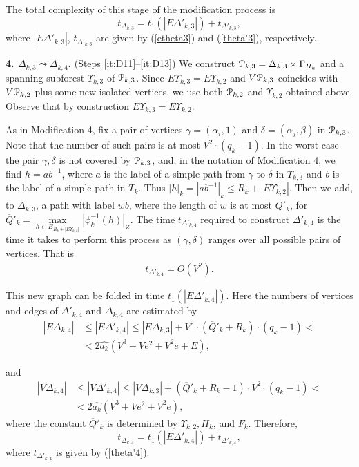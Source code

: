 \documentclass[a4paper,12pt]{article}
\renewcommand{\a}{\alpha }
\renewcommand{\b}{\beta }
\newcommand{\G}{\Gamma }
\newcommand{\g}{\gamma }
\newcommand{\D}{\Delta }
\renewcommand{\d}{\delta }
\newcommand{\U}{\Upsilon }
\newcommand{\cP}{{\cal{P}}}
\numberwithin{equation}{section}
\numberwithin{figure}{section}
\begin{document}
The total complexity of this stage of the modification process is
\begin{equation}\label{theta3}
t_{\D_{k,3}} = t_1(|E\D'_{k,3}|)
+ t_{\D'_{k,3}},
\end{equation}
where $|E\D'_{k,3}|$, $t_{\D'_{k,3}}$ are given by (\ref{etheta3}) and
(\ref{theta'3}), respectively.


{\bf 4. $\D_{k,3} \leadsto \D_{k,4}$.} (Steps \ref{it:D11}--\ref{it:D13})
We construct $\cP_{k,3}=\D_{k,3}\times
\G_{H_k}$ and a
spanning subforest $\U_{k,3}$ of $\cP_{k,3}$. Since $E\U_{k,3} =
E\U_{k,2}$ and $V\cP_{k,3}$ coincides with $V\cP_{k,2}$ plus some new isolated
vertices, we use both $\cP_{k,2}$ and $\U_{k,2}$ obtained above. Observe that by construction $E\U_{k,3} =
E\U_{k,2}$.


As in Modification 4, fix a pair of vertices $\g=(\a_i,1)$ and
$\d=(\a_j,\b)$ in $\cP_{k,3}$. Note that the number of such pairs is
at most $V^2 \cdot (q_k-1)$. In the worst case the pair $\g, \d$ is
not covered by $\cP_{k,3}$, and, in the notation of Modification 4, we
find $h=ab^{-1}$, where $a$ is the label of a simple path from
$\g$ to $\d$ in $\U_{k,3}$ and $b$ is the label of a simple path in
$T_k$. Thus $|h|_k = |ab^{-1}|_k \le R_k+ | E\U_{k,2}|$.  Then we add,
to $\D_{k,3}$, a path with label $wb$, where the length of $w$ is
 at most $\overline{Q}'_k$, for
$\overline{Q}'_k=\max\limits_{h \in B_{R_k+|
E\U_{k,2}|}}|\phi^{-1}_k(h)|_Z$.
The time $t_{\D'_{k,4}}$ required to construct $\D'_{k,4}$ is the time
it takes to perform this process as $(\g,\d)$ ranges over all
possible pairs of vertices. That is
\begin{equation}\label{theta'4}
\begin{split}
t_{\D'_{k,4}} =
 O(V^2).
\end{split}
\end{equation}

This new graph can be folded in time $t_1(|E\D'_{k,4}|)$. Here the
numbers of vertices and edges of $\D'_{k,4}$ and $\D_{k,4}$ are estimated
by
\begin{equation}\label{etheta4}
\begin{split}
|E\D_{k,4}| &\le |E\D'_{k,4}| \le |E\D_{k,3}|+ V^2 \cdot (\overline{Q}'_k +
R_k)\cdot(q_k-1)<\\
&< 2 \hat{a_k}(V^3+Ve^2+V^2 e+E),
\end{split}
\end{equation}

and
\begin{equation}\label{vtheta4}
\begin{split}
|V\D_{k,4}| &\le |V \D'_{k,4}| \le |V \D_{k,3}| +(\overline{Q}'_k+R_k-1)\cdot
V^2 \cdot(q_k-1)<\\
&< 2 \hat{a_k}(V^3+Ve^2+V^2 e),
\end{split}
\end{equation}
where the constant $\overline{Q}'_k$ is determined by $\U_{k,2}, H_k$, and
$F_k$.
Therefore,
\begin{equation}\label{theta4}
t_{\D_{k,4}} = t_1(|E\D'_{k,4}|) + t_{\D'_{k,4}},
\end{equation}
where $t_{\D'_{k,4}}$ is given by (\ref{theta'4}).
\end{document}
